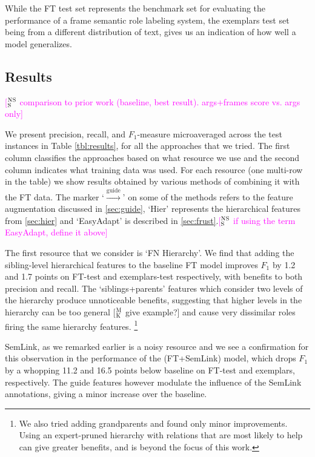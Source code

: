 \documentclass[11pt,a4paper]{article}
\newcommand{\ensuretext}[1]{#1}
\newcommand{\nssmarker}{\ensuretext{\textcolor{magenta}{\ensuremath{^{\textsc{NS}}_{\textsc{S}}}}}}
\newcommand{\mkmarker}{\ensuretext{\textcolor{mdgreen}{\ensuremath{^{\textsc{M}}_{\textsc{K}}}}}}
\newcommand{\arkcomment}[3]{\ensuretext{\textcolor{#3}{[#1 #2]}}}
\newcommand{\nss}[1]{\arkcomment{\nssmarker}{#1}{magenta}}
\newcommand{\mk}[1]{\arkcomment{\mkmarker}{#1}{mdgreen}}
\begin{document}
While the FT test set represents the benchmark set for evaluating the 
performance of a frame semantic role labeling system, the exemplars test set being from a different distribution of text, gives us
an indication of how well a model generalizes.

\subsection{Results}

\nss{comparison to prior work (baseline, best result). args+frames score vs. args only}

We present precision, recall, and $F_1$-measure microaveraged across the test instances in Table \ref{tbl:results}, for all the approaches that we tried.
The first column classifies the approaches based on what resource we use and the second column indicates what training data was used. 
For each resource (one multi-row in the table) we show results obtained by various methods of combining it with the FT data.
The marker `$\xrightarrow{\text{guide}}$' on some of the methods refers to the feature augmentation discussed in \cref{sec:guide},
`Hier' represents the hierarchical features from \cref{sec:hier} and `EasyAdapt' is described in \cref{sec:frust}.\nss{if using the term EasyAdapt, define it above}



The first resource that we consider is `FN Hierarchy'. We find that adding the sibling-level hierarchical features to the baseline FT model improves 
$F_1$ by 1.2 and 1.7 points on FT-test and exemplars-test respectively,
with benefits to both precision and recall. The `siblings+parents' features which consider two levels of the hierarchy produce unnoticeable benefits,
suggesting that higher levels in the hierarchy can be too general \mk{give example?} and cause very dissimilar roles firing the same hierarchy features.%
\footnote{We also tried adding grandparents and found only minor improvements. Using an expert-pruned hierarchy with relations that are
most likely to help can give greater benefits, and is beyond the focus of this work.}

SemLink, as we remarked earlier is a noisy resource and we see a confirmation for this observation in the performance of the (FT+SemLink) model,
which drops $F_1$ by a whopping 11.2 and 16.5 points below baseline on FT-test and exemplars, respectively. The guide features however modulate the influence
of the SemLink annotations, giving a minor increase over the baseline. 
\end{document}
